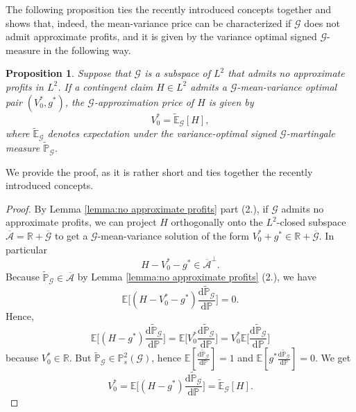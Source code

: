 \documentclass[11pt,a4paper,twoside,openany]{report}
\numberwithin{equation}{section}
\newcommand{\diff}{\mathrm{d}}
\theoremstyle{plain} %
\newtheorem{proposition}[theorem]{Proposition}
\theoremstyle{definition} %
\theoremstyle{remark} %
\begin{document}
The following proposition ties the recently introduced concepts together and shows that, indeed, the mean-variance price can be characterized if \(\mathcal{G}\) does not admit approximate profits, and it is given by the variance optimal signed \(\mathcal{G}\)-measure in the following way.
\begin{proposition}\label{prop:mean variance price}
Suppose that $\mathcal{G}$ is a subspace of $L^2$ that admits no
approximate profits in $L^2$. If a contingent claim $H\in L^2$ admits a
$\mathcal{G}$-mean-variance optimal pair $(V_0^*,g^*)$, the
$\mathcal{G}$-approximation price of $H$ is given by
\[
V_0^*=\widetilde{\mathbb{E}}_{\mathcal{G}}[H],
\]
where $\widetilde{\mathbb{E}}_{\mathcal{G}}$ denotes expectation under the variance-optimal
signed $\mathcal{G}$-martingale measure $\widetilde{\mathbb{P}}_{\mathcal{G}}$.
\end{proposition}
We provide the proof, as it is rather short and ties together the recently introduced concepts.
\begin{proof}
    By Lemma \ref{lemma:no approximate profits} part (2.), if \(\mathcal{G}\) admits no approximate profits, we can project \(H\) orthogonally onto the \(L^2\)-closed subspace \(\overline{\mathcal{A}}=\mathbb{R}+\overline{\mathcal{G}}
    \) to get a \(\mathcal{G}\)-mean-variance solution of the form \(V_0^*+g^*\in \mathbb{R}+\overline{\mathcal{G}}\). In particular
    \begin{equation*}
        H-V_0^*-g^*\in\overline{\mathcal{A}}^{\perp}.
    \end{equation*}
   Because \(\widetilde{\mathbb{P}}_{\mathcal{G}}\in\overline{\mathcal{A}}\) by Lemma \ref{lemma:no approximate profits} (2.), we have 
    \begin{equation*}
        \mathbb{E}\bigg[(H-V_0^*-g^*)\frac{\diff \widetilde{\mathbb{P}}_{\mathcal{G}}}{\diff \mathbb{P}}\bigg]=0.
    \end{equation*}
    Hence, 
    \begin{equation*}
        \mathbb{E}\bigg[(H-g^*)\frac{\diff \widetilde{\mathbb{P}}_{\mathcal{G}}}{\diff \mathbb{P}}\bigg]=\mathbb{E}\bigg[V_0^*\frac{\diff \widetilde{\mathbb{P}}_{\mathcal{G}}}{\diff \mathbb{P}}\bigg]=V_0^*\mathbb{E}\bigg[\frac{\diff \widetilde{\mathbb{P}}_{\mathcal{G}}}{\diff \mathbb{P}}\bigg]
    \end{equation*}
    because \(V_0^*\in\mathbb{R}\). But \(\widetilde{\mathbb{P}}_{\mathcal{G}}\in\mathbb{P}^2_s(\mathcal{G})\), hence \(\mathbb{E}[\frac{\diff\widetilde{\mathbb{P}}_{\mathcal{G}}}{\diff \mathbb{P}}]=1\) and \(\mathbb{E}[g^*\frac{\diff\widetilde{\mathbb{P}}_{\mathcal{G}}}{\diff \mathbb{P}}]=0\). We get
    \begin{equation*}
        V_0^*=\mathbb{E}\bigg[(H-g^*)\frac{\diff\widetilde{\mathbb{P}}_{\mathcal{G}}}{\diff \mathbb{P}}\bigg]=\widetilde{\mathbb{E}}_{\mathcal{G}}[H].
    \end{equation*}
\end{proof}
\end{document}
